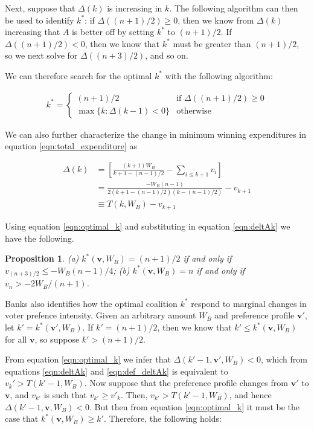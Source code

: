 \documentclass[12pt,a4paper]{article}
\newtheorem{proposition}{Proposition}
\begin{document}
Next, suppose that $\Delta(k)$ is increasing in $k$. The following algorithm can then be used to identify $k^*$: if $\Delta((n + 1)/2) \geq 0$, then we know from $\Delta(k)$ increasing that $A$ is better off by setting $k^*$ to $(n + 1)/2$. If $\Delta((n + 1)/2) < 0$, then we know that $k^*$ must be greater than $(n + 1)/2$, so we next solve for $\Delta((n + 3)/2)$, and so on.

We can therefore search for the optimal $k^*$ with the following algorithm:

\begin{align}
    \label{eqn:optimal_k}
    k^* = 
    \begin{cases}
        (n + 1)/2 & \text{if } \Delta((n + 1)/2) \geq 0 \\
        \max\{k : \Delta(k - 1) < 0\} & \text{otherwise}
    \end{cases}
\end{align}

We can also further characterize the change in minimum winning expenditures in equation \ref{eqn:total_expenditure} as

\begin{align}
    \Delta(k)  & = \left[\frac{(k + 1)W_B}{k + 1 - (n - 1)/2} - \sum_{i \leq k + 1}v_i \right]\\
    \label{eqn:deltAk}
    & = \frac{-W_B (n - 1)}{2(k + 1 - (n - 1)/2)(k - (n - 1)/2)} - v_{k + 1}\\
    \label{eqn:def_deltAk}
    & \equiv T(k, W_B) - v_{k + 1}
\end{align}

Using equation \ref{eqn:optimal_k} and substituting in equation \ref{eqn:deltAk} we have the following.

\begin{proposition}
    (a) $k^*(\mathbf{v}, W_B) = (n + 1)/2$ if and only if $v_{(n + 3)/2} \leq -W_B(n - 1)/4$; (b) $k^*(\mathbf{v}, W_B) = n$ if and only if $v_n > -2W_B/(n + 1)$.
\end{proposition}

Banks also identifies how the optimal coalition $k^*$ respond to marginal changes in voter prefence intensity. Given an arbitrary amount $W_B$ and preference profile $\mathbf{v}'$, let $k' = k^*(\mathbf{v'}, W_B)$. If $k' = (n + 1)/2$, then we know that $k' \leq k^*(\mathbf{v}, W_B)$ for all $\mathbf{v}$, so suppose $k' > (n + 1)/2$.

From equation \ref{eqn:optimal_k} we infer that $\Delta(k' - 1, \mathbf{v}', W_B) < 0$, which from equations \ref{eqn:deltAk} and \ref{eqn:def_deltAk} is equivalent to $v_k' > T(k' - 1, W_B)$. Now suppose that the preference profile changes from $\mathbf{v}'$ to $\mathbf{v}$, and $v_{k'}$ is such that $v_{k'} \geq v'_k$. Then, $v_{k'} > T(k' - 1, W_B)$, and hence $\Delta(k' - 1, \mathbf{v}, W_B) < 0$. But then from equation \ref{eqn:optimal_k} it must be the case that $k^*(\mathbf{v}, W_B) \geq k'$. Therefore, the following holds:
\end{document}
